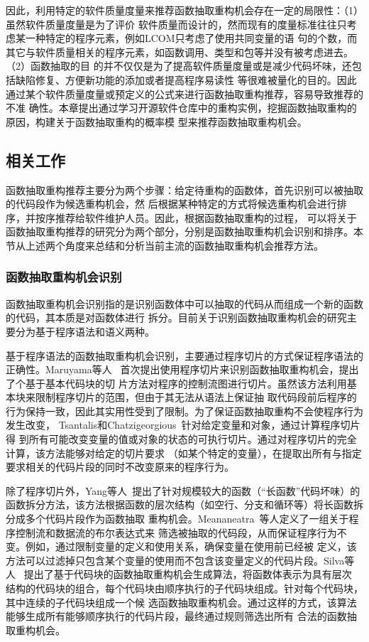 因此，利用特定的软件质量度量来推荐函数抽取重构机会存在一定的局限性：（1）虽然软件质量度量是为了评价
软件质量而设计的，然而现有的度量标准往往只考虑某一种特定的程序元素，例如LCOM只考虑了使用共同变量的语
句的个数，而其它与软件质量相关的程序元素，如函数调用、类型和包等并没有被考虑进去。（2）函数抽取的目
的并不仅仅是为了提高软件质量度量或是减少代码坏味，还包括缺陷修复、方便新功能的添加或者提高程序易读性
等很难被量化的目的。因此通过某个软件质量度量或预定义的公式来进行函数抽取重构推荐，容易导致推荐的不准
确性。本章提出通过学习开源软件仓库中的重构实例，挖掘函数抽取重构的原因，构建关于函数抽取重构的概率模
型来推荐函数抽取重构机会。

\subsection{相关工作}
函数抽取重构推荐主要分为两个步骤：给定待重构的函数体，首先识别可以被抽取的代码段作为候选重构机会，然
后根据某种特定的方式将候选重构机会进行排序，并按序推荐给软件维护人员。因此，根据函数抽取重构的过程，
可以将关于函数抽取重构推荐的研究分为两个部分，分别是函数抽取重构机会识别和排序。本节从上述两个角度来总结和分析当前主流的函数抽取重构机会推荐方法。

\subsubsection{函数抽取重构机会识别}

函数抽取重构机会识别指的是识别函数体中可以抽取的代码从而组成一个新的函数的代码，其本质是对函数体进行
拆分。目前关于识别函数抽取重构机会的研究主要分为基于程序语法和语义两种。

基于程序语法的函数抽取重构机会识别，主要通过程序切片的方式保证程序语法的正确性。Maruyama等人
~\cite{maruyama2001automated}首次提出使用程序切片来识别函数抽取重构机会，提出了个基于基本代码块的切
片方法对程序的控制流图进行切片。虽然该方法利用基本块来限制程序切片的范围，但由于其无法从语法上保证抽
取代码段前后程序的行为保持一致，因此其实用性受到了限制。为了保证函数抽取重构不会使程序行为发生改变，
Tsantalis和Chatzigeorgious~\cite{tsantalis2011identification}针对给定变量和对象，通过计算程序切片得
到所有可能改变变量的值或对象的状态的可执行切片。通过对程序切片的完全计算，该方法能够对给定的切片要求
（如某个特定的变量），在提取出所有与指定要求相关的代码片段的同时不改变原来的程序行为。

除了程序切片外，Yang等人~\cite{yang2009identifying}提出了针对规模较大的函数（``长函数''代码坏味）的
函数拆分方法，该方法根据函数的层次结构（如空行、分支和循环等）将长函数拆分成多个代码片段作为函数抽取
重构机会。Meananeatra~\cite{meananeatra2011using}等人定义了一组关于程序控制流和数据流的布尔表达式来
筛选被抽取的代码段，从而保证程序行为不变。例如，通过限制变量的定义和使用关系，确保变量在使用前已经被
定义，该方法可以过滤掉只包含某个变量的使用而不包含该变量定义的代码片段。Silva等人
~\cite{silva:ICPC14,silva:CoRR15}提出了基于代码块的函数抽取重构机会生成算法，将函数体表示为具有层次
结构的代码块的组合，每个代码块由顺序执行的子代码块组成。针对每个代码块，其中连续的子代码块组成一个候
选函数抽取重构机会。通过这样的方式，该算法能够生成所有能够顺序执行的代码片段，最终通过规则筛选出所有
合法的函数抽取重构机会。

